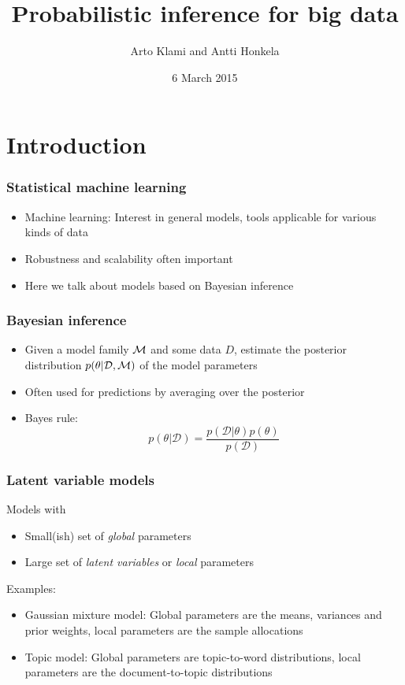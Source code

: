 \documentclass{beamer}
\title{Probabilistic inference for big data}
\author{Arto Klami and Antti Honkela}
\date{6 March 2015}
\newcommand{\dataset}{\mathcal{D}}
\newcommand{\parameters}{\theta}
\begin{document}
\frame{\titlepage}


\section{Introduction}

\begin{frame}
  \frametitle{Statistical machine learning}

  \begin{itemize}
  \item Machine learning: Interest in general models, tools applicable
    for various kinds of data
  \item Robustness and scalability often important
  \item Here we talk about models based on Bayesian inference
  \end{itemize}
\end{frame}

\begin{frame}
  \frametitle{Bayesian inference}

  \begin{itemize}
  \item Given a model family ${\cal M}$ and some data $D$, estimate
    the posterior distribution $p(\parameters|\dataset,{\cal M})$ of the model
    parameters
  \item Often used for predictions by averaging over the posterior
  \item Bayes rule:
    \[
    p(\parameters|\dataset) = \frac{p(\dataset|\parameters)p(\parameters)}{p(\dataset)}
    \]
  \end{itemize}
\end{frame}

\begin{frame}
  \frametitle{Latent variable models}

  Models with
  \begin{itemize}
  \item Small(ish) set of \emph{global} parameters
  \item Large set of \emph{latent variables} or \emph{local} parameters
  \end{itemize}

  Examples:
  \begin{itemize}
  \item Gaussian mixture model: Global parameters are the means,
    variances and prior weights, local parameters are the sample
    allocations
  \item Topic model: Global parameters are topic-to-word distributions,
    local parameters are the document-to-topic distributions
  \end{itemize}
\end{frame}
\end{document}
